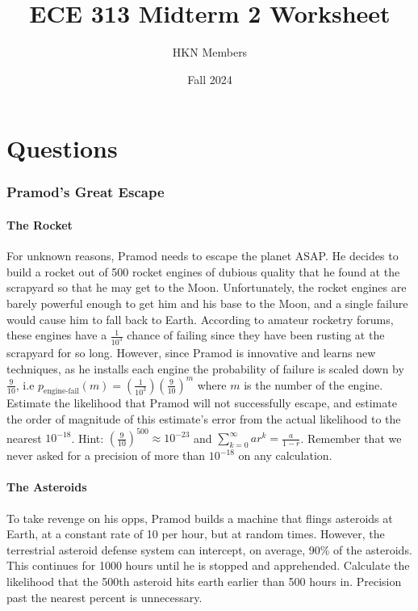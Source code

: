 \documentclass{exam}
\title{ECE 313 Midterm 2 Worksheet}
\author{HKN Members}
\date{Fall 2024}
\begin{document}
\maketitle
\part*{Questions}
\section{Pramod's Great Escape}
\subsection{The Rocket}
For unknown reasons, Pramod needs to escape the planet ASAP. He decides to build a rocket out of 500 rocket engines of dubious quality that he found at the scrapyard so that he may get to the Moon. Unfortunately, the rocket engines are barely powerful enough to get him and his base to the Moon, and a single failure would cause him to fall back to Earth. According to amateur rocketry forums, these engines have a $\frac{1}{10^3}$ chance of failing since they have been rusting at the scrapyard for so long. However, since Pramod is innovative and learns new techniques, as he installs each engine the probability of failure is scaled down by $\frac{9}{10}$, i.e $p_{\text{engine-fail}}(m) = (\frac{1}{10^3})(\frac{9}{10})^m$ where $m$ is the number of the engine. Estimate the likelihood that Pramod will not successfully escape, and estimate the order of magnitude of this estimate's error from the actual likelihood to the nearest $10^{-18}$. 
\newline
\newline
Hint: $(\frac{9}{10})^{500} \approx 10^{-23}$ and $\sum_{k=0}^{\infty} ar^k = \frac{a}{1-r}$. Remember that we never asked for a precision of more than $10^{-18}$ on any calculation. 
\vspace{5cm}

\subsection{The Asteroids}
To take revenge on his opps, Pramod builds a machine that flings asteroids at Earth, at a constant rate of 10 per hour, but at random times. However, the terrestrial asteroid defense system can intercept, on average, 90\% of the asteroids. This continues for 1000 hours until he is stopped and apprehended. Calculate the likelihood that the 500th asteroid hits earth earlier than 500 hours in. Precision past the nearest percent is unnecessary. 
\vspace{5cm}
\end{document}
